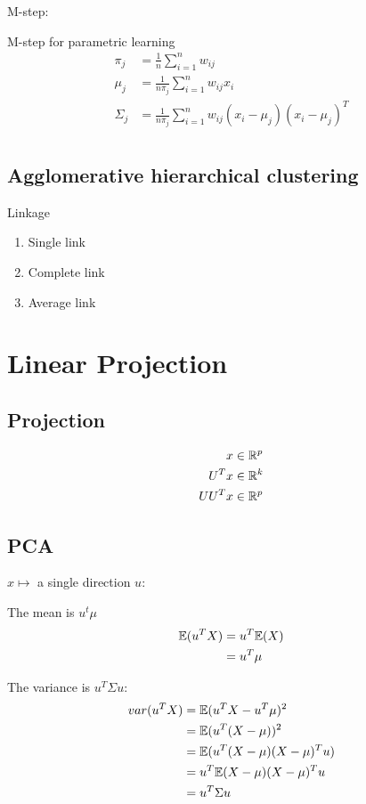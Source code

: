 \documentclass[a4paper]{report}
\begin{document}
M-step:

M-step for parametric learning 
\begin{align*}
\pi_j &= \frac{1}{n} \sum_{i=1}^n w_{ij} \\
\mu_j &= \frac{1}{n\pi_j} \sum_{i=1}^n w_{ij} x_i \\
\Sigma_j &= \frac{1}{n\pi_j} \sum_{i=1}^n w_{ij}(x_i-\mu_j)(x_i-\mu_j)^T
\end{align*}
\begin{align*}

\end{align*}
\section{Agglomerative hierarchical clustering}
Linkage
\begin{enumerate}
\item Single link
\item Complete link 
\item Average link 
\end{enumerate}


\chapter{Linear Projection}
\section{Projection}
\begin{align*}
x &\in \mathbb{R}^p\\
U^T x &\in \mathbb{R}^k \\
UU^Tx &\in \mathbb{R}^p
\end{align*}

\section{PCA}
$x \mapsto$ a single direction $u$:

The mean is $u^t\mu$
\begin{align*}
\mathbb{E}(u^T X) &= u^T \mathbb{E}(X) \\
&= u^T \mu
\end{align*}

The variance is $u^T \Sigma u$:
\begin{align*}
var(u^T X) &= \mathbb{E}(u^T X-u^T \mu)^2\\
&= \mathbb{E}(u^T(X-\mu))^2\\
&= \mathbb{E}(u^T(X-\mu)(X-\mu)^Tu)\\
&= u^T \mathbb{E}(X-\mu)(X-\mu)^T u  \\
&= u^T \Sigma u
\end{align*}
\end{document}
